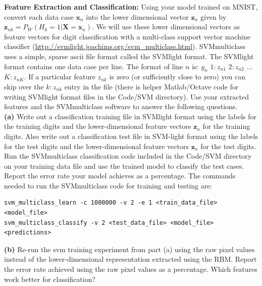 \documentclass[11pt]{article}
\newcommand{\mbf}[1]{{\mathbf{#1}}}
\begin{document}
\begin{problem}{30} \textbf{Feature Extraction and Classification:} Using your model trained on MNIST, convert each data case $\mbf{x}_n$ into the lower dimensional vector $\mbf{z}_n$ given by $\mbf{z}_{nk} = P_W(H_k=1|\mbf{X}=\mbf{x}_n)$. We will use these lower dimensional vectors as feature vectors for digit classification with a multi-class support vector machine classifier (\url{http://svmlight.joachims.org/svm_multiclass.html}). SVMmulticlass uses a simple, sparse ascii file format called the SVMlight format. The SVMlight format contains one data case per line. The format of line $n$ is: $y_n$ $1:z_{n1}$ $2:z_{n2}$ ... $K:z_{nK}$. If a particular feature $z_{nk}$ is zero (or sufficiently close to zero) you can skip over the $k:z_{nk}$ entry in the file (there is helper Matlab/Octave code for writing SVMlight format files in the Code/SVM directory). Use your extracted features and the SVMmulticlass software to answer the following questions.\\

\textbf{(a)} Write out a classification training file in SVMlight format using the labels for the training digits and the lower-dimensional feature vectors $\mbf{z}_n$ for the training digits. Also write out a classification test file in SVM-light format using the labels for the test digits and the lower-dimensional feature vectors $\mbf{z}_n$ for the test digits. Run the SVMmulticlass classification code included in the Code/SVM directory on your training data file and use the trained model to classify the test cases. Report the error rate your model achieves as a percentage. The commands needed to run the SVMmulticlass code for training and testing are:\\

\begin{verbatim}
svm_multiclass_learn -c 1000000 -v 2 -e 1 <train_data_file> <model_file>
svm_multiclass_classify -v 2 <test_data_file> <model_file> <predictions>
\end{verbatim}

\textbf{(b)} Re-run the svm training experiment from part (a) using the raw pixel values instead of the lower-dimensional representation extracted using the RBM. Report the error rate achieved using the raw pixel values as a percentage. Which features work better for classification?

\end{problem}

\showpoints
\end{document}
